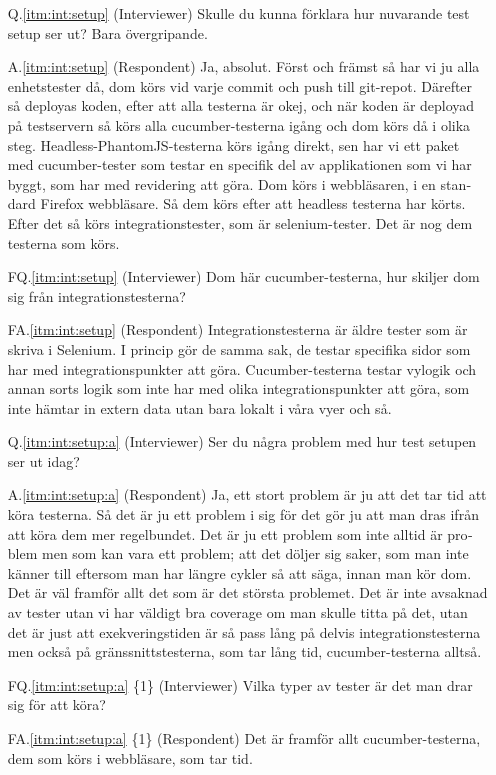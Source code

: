 \begin{otherlanguage}{swedish}
\begin{itemize}
  \item[Q.\ref{itm:int:setup}] (Interviewer) Skulle du kunna förklara hur nuvarande test setup ser ut? Bara övergripande.
  \item[A.\ref{itm:int:setup}] (Respondent) Ja, absolut. Först och främst så har vi ju alla enhetstester då, dom körs vid varje commit och push till git-repot. Därefter så deployas koden, efter att alla testerna är okej, och när koden är deployad på testservern så körs alla cucumber-testerna igång och dom körs då i olika steg. Headless-PhantomJS-testerna körs igång direkt, sen har vi ett paket med cucumber-tester som testar en specifik del av applikationen som vi har byggt, som har med revidering att göra. Dom körs i webbläsaren, i en standard Firefox webbläsare. Så dem körs efter att headless testerna har körts. Efter det så körs integrationstester, som är selenium-tester. Det är nog dem testerna som körs.
    \item[FQ.\ref{itm:int:setup}] (Interviewer) Dom här cucumber-testerna, hur skiljer dom sig från integrationstesterna?
    \item[FA.\ref{itm:int:setup}] (Respondent) Integrationstesterna är äldre tester som är skriva i Selenium. I princip gör de samma sak, de testar specifika sidor som har med integrationspunkter att göra. Cucumber-testerna testar vylogik och annan sorts logik som inte har med olika integrationspunkter att göra, som inte hämtar in extern data utan bara lokalt i våra vyer och så.  
  \item[Q.\ref{itm:int:setup:a}] (Interviewer) Ser du några problem med hur test setupen ser ut idag?
  \item[A.\ref{itm:int:setup:a}] (Respondent) Ja, ett stort problem är ju att det tar tid att köra testerna. Så det är ju ett problem i sig för det gör ju att man dras ifrån att köra dem mer regelbundet. Det är ju ett problem som inte alltid är problem men som kan vara ett problem; att det döljer sig saker, som man inte känner till eftersom man har längre cykler så att säga, innan man kör dom. Det är väl framför allt det som är det största problemet. Det är inte avsaknad av tester utan vi har väldigt bra coverage om man skulle titta på det, utan det är just att exekveringstiden är så pass lång på delvis integrationstesterna men också på gränssnittstesterna, som tar lång tid, cucumber-testerna alltså.
  \item[FQ.\ref{itm:int:setup:a} \{1\}]\label{itm:fq2a:1} (Interviewer) Vilka typer av tester är det man drar sig för att köra?
  \item[FA.\ref{itm:int:setup:a} \{1\}] (Respondent) Det är framför allt cucumber-testerna, dem som körs i webbläsare, som tar tid.

\end{itemize}
\end{otherlanguage}
